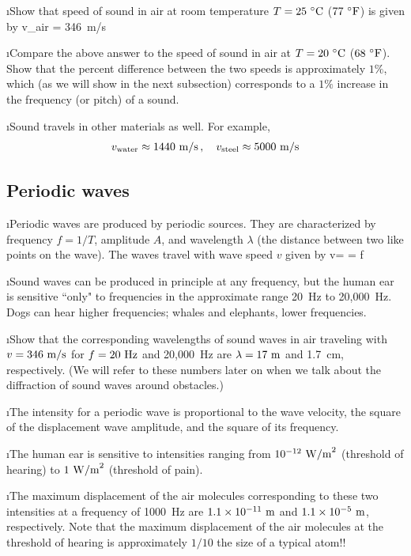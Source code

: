 \i \exer Show that speed of sound in air at room temperature
$T=25~{}^\circ{\rm C}$ ($77~{}^\circ{\rm F}$) is given by
%
\be
v_{\rm air} = 346~{\rm m/s}
\ee

\i \exer Compare the above answer to the speed of sound in
air at $T=20~{}^\circ{\rm C}$ ($68~{}^\circ{\rm F}$).
Show that the percent difference between the two speeds is
approximately $1\%$, which (as we will show in the next subsection)
corresponds to a $1\%$ increase in the frequency (or pitch)
of a sound.

\i Sound travels in other materials as well.
For example, 
%
\begin{align}
v_{\rm water} \approx 1440~{\rm m/s}\,,
\quad
v_{\rm steel} \approx 5000~{\rm m/s}
\end{align}

\ei

\subsection{Periodic waves}

\bi

\i Periodic waves are produced by periodic sources.
They are characterized by frequency $f=1/T$, amplitude $A$, and
wavelength $\lambda$ (the distance between two like points on the
wave).
The waves travel with wave speed $v$ given by 
%
\be
v= = f\lambda
\ee

\i Sound waves can be produced in principle at any frequency,
but the human ear is sensitive ``only" to frequencies
in the approximate range 20~Hz to 20,000~Hz.
Dogs can hear higher frequencies;
whales and elephants, lower frequencies.

\i \exer Show that the corresponding wavelengths of
sound waves in air traveling with $v=346~{\rm m/s}$ 
for $f=20~{\rm Hz}$ and 20,000~Hz are 
$\lambda = 17~{\rm m}$ and 1.7~cm, respectively.
(We will refer to these numbers later on when we talk 
about the diffraction of sound waves around obstacles.)

\i The intensity for a periodic wave is proportional to 
the wave velocity,
the square of the displacement wave amplitude, 
and the square of its frequency.

\i The human ear is sensitive to intensities ranging
from $10^{-12}~{\rm W/m}^2$ (threshold of hearing) to
$1~{\rm W/m}^2$ (threshold of pain).

\i The maximum displacement of the air molecules corresponding
to these two intensities at a frequency of 1000~Hz are
$1.1\times 10^{-11}~{\rm m}$ and $1.1\times 10^{-5}~{\rm m}$,
respectively.
Note that the maximum displacement of the air molecules at
the threshold of hearing is approximately $1/10$ the
size of a typical atom!!

